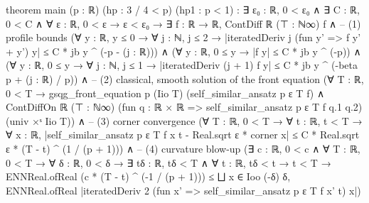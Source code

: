 \documentclass[11pt]{amsart}
\theoremstyle{definition}
\theoremstyle{remark}
\numberwithin{equation}{section}
\begin{document}
\par
\noindent\begin{minipage}{\linewidth}
\begin{leancode}
theorem main (p : ℝ) (hp : 3 / 4 < p) (hp1 : p < 1) :
    ∃ ε₀ : ℝ, 0 < ε₀ ∧ ∃ C : ℝ, 0 < C ∧
      ∀ ε : ℝ, 0 < ε → ε < ε₀ →
        ∃ f : ℝ → ℝ, ContDiff ℝ (⊤ : ℕ∞) f ∧
          -- (1) profile bounds
          (∀ y : ℝ, y ≤ 0 → ∀ j : ℕ, j ≤ 2 →
              |iteratedDeriv j (fun y' => f y' + y') y| ≤ C * jb y ^ (-p - (j : ℝ))) ∧
          (∀ y : ℝ, 0 ≤ y → |f y| ≤ C * jb y ^ (-p)) ∧
          (∀ y : ℝ, 0 ≤ y → ∀ j : ℕ, j ≤ 1 →
              |iteratedDeriv (j + 1) f y| ≤ C * jb y ^ (-beta p + (j : ℝ) / p)) ∧
          -- (2) classical, smooth solution of the front equation
          (∀ T : ℝ, 0 < T →
              gsqg_front_equation p (Iio T) (self_similar_ansatz p ε T f) ∧
              ContDiffOn ℝ (⊤ : ℕ∞) (fun q : ℝ × ℝ => self_similar_ansatz p ε T f q.1 q.2)
                (univ ×ˢ Iio T)) ∧
          -- (3) corner convergence
          (∀ T : ℝ, 0 < T → ∀ t : ℝ, t < T → ∀ x : ℝ,
              |self_similar_ansatz p ε T f x t - Real.sqrt ε * corner x| ≤
                C * Real.sqrt ε * (T - t) ^ (1 / (p + 1))) ∧
          -- (4) curvature blow-up
          (∃ c : ℝ, 0 < c ∧ ∀ T : ℝ, 0 < T → ∀ δ : ℝ, 0 < δ →
              ∃ tδ : ℝ, tδ < T ∧ ∀ t : ℝ, tδ < t → t < T →
                ENNReal.ofReal (c * (T - t) ^ (-1 / (p + 1))) ≤
                  ⨆ x ∈ Ioo (-δ) δ,
                    ENNReal.ofReal |iteratedDeriv 2 (fun x' => self_similar_ansatz p ε T f x' t) x|)
\end{leancode}
\end{minipage}
\par
\end{document}
